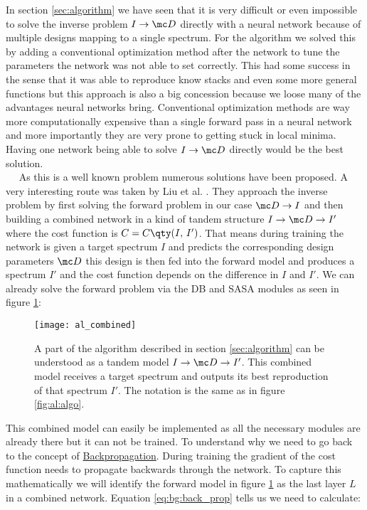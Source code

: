 In section \ref{sec:algorithm} we have seen that it is very difficult or even impossible to solve the inverse problem $I \rightarrow \mc D$ directly with a neural network because of multiple designs mapping to a single spectrum. For the algorithm we solved this by adding a conventional optimization method after the network to tune the parameters the network was not able to set correctly. This had some success in the sense that it was able to reproduce know stacks and even some more general functions  but this approach is also a big concession because we loose many of the advantages neural networks bring. Conventional optimization methods are way more computationally expensive than a single forward pass in a neural network and more importantly they are very prone to getting stuck in local minima. Having one network being able to solve $I \rightarrow \mc D$ directly would be the best solution.
\\

$\quad$ As this is a well known problem numerous solutions have been proposed. A very interesting route was taken by Liu et al. \cite{Liu2018}. They approach the inverse problem by first solving the forward problem in our case $\mc D \rightarrow I$ and then building a combined network in a kind of tandem structure 
$I \rightarrow \mc D \rightarrow I'$
where the cost function is 
$C = C \qty(I, \, I')$.
That means during training the network is given a target spectrum $I$ and predicts the corresponding design parameters $\mc D$ this design is then fed into the forward model and produces a spectrum $I'$ and the cost function depends on the difference in $I$ and $I'$. We can already solve the forward problem via the DB and SASA modules as seen in figure \ref{fig:al:combined}:
\\

\begin{figure}[H]
    \centering
    \texttt{[image: al\_combined]}
    \caption{A part of the algorithm described in section \ref{sec:algorithm} can be understood as a tandem model 
    $I \rightarrow \mc D \rightarrow I'$.
    This combined model receives a target spectrum and outputs its best reproduction of that spectrum $I'$. The notation is the same as in figure \ref{fig:al:algo}.}
    \label{fig:al:combined}
\end{figure}


This combined model can easily be implemented as all the necessary modules are already there but it can not be trained. To understand why we need to go back to the concept of {\hyperref[eq:bg:back_prop]{Backpropagation}}.
During training the gradient of the cost function needs to propagate backwards through the network. To capture this mathematically we will identify the forward model in figure \ref{fig:al:combined} as the last layer $L$ in a combined network. Equation \eqref{eq:bg:back_prop} tells us we need to calculate:

